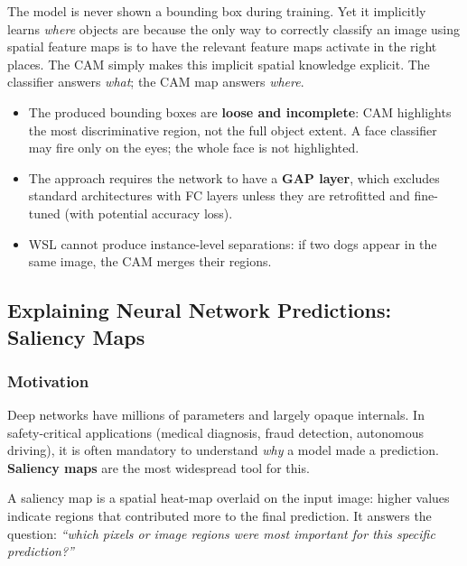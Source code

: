 \documentclass[11pt,a4paper]{article}
\newcommand{\term}[1]{\textcolor{DefGreen}{\textbf{#1}}}
\begin{document}
\begin{insightbox}
The model is never shown a bounding box during training. Yet it implicitly learns \emph{where} objects are because the only way to correctly classify an image using spatial feature maps is to have the relevant feature maps activate in the right places. The CAM simply makes this implicit spatial knowledge explicit. The classifier answers \emph{what}; the CAM map answers \emph{where}.
\end{insightbox}

\begin{warnbox}
\begin{itemize}
  \item The produced bounding boxes are \textbf{loose and incomplete}: CAM highlights the most discriminative region, not the full object extent. A face classifier may fire only on the eyes; the whole face is not highlighted.
  \item The approach requires the network to have a \textbf{GAP layer}, which excludes standard architectures with FC layers unless they are retrofitted and fine-tuned (with potential accuracy loss).
  \item WSL cannot produce instance-level separations: if two dogs appear in the same image, the CAM merges their regions.
\end{itemize}
\end{warnbox}

\subsection{Explaining Neural Network Predictions: Saliency Maps}
\label{sec:saliency}

\subsubsection{Motivation}

Deep networks have millions of parameters and largely opaque internals. In safety-critical applications (medical diagnosis, fraud detection, autonomous driving), it is often mandatory to understand \emph{why} a model made a prediction. \term{Saliency maps} are the most widespread tool for this.

A saliency map is a spatial heat-map overlaid on the input image: higher values indicate regions that contributed more to the final prediction. It answers the question: \emph{``which pixels or image regions were most important for this specific prediction?''}
\end{document}
